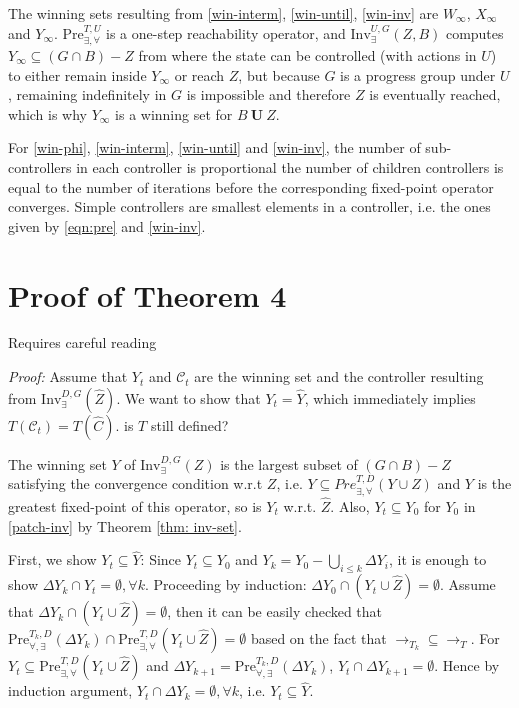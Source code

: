 The winning sets {\color{black} resulting from} \eqref{win-interm}, \eqref{win-until}, \eqref{win-inv} are $ W_{\infty} $, $ X_{\infty} $ and $ Y_{\infty} $. {\color{black} $\text{Pre}_{\exists,\forall}^{T,U}$ is a one-step reachability operator, and $\text{Inv}_{\exists}^{U,G}(Z,B)$ computes $Y_\infty \subseteq (G\cap B) - Z$ from where the state can be controlled (with actions in $U$) to either remain inside $Y_\infty$ or reach $Z$, but because $G$ is a progress group under $U$, remaining indefinitely in $G$ is impossible and therefore $Z$ is
	eventually reached, which is why $Y_\infty$ is a winning set for $B\mathbf{\ U\ }Z$.}
    
    For \eqref{win-phi}, \eqref{win-interm}, \eqref{win-until} and \eqref{win-inv}, the number of sub-controllers in each controller is proportional 
    {\color{purple} the number of children controllers is equal} 
    to the number of iterations before the corresponding fixed-point operator converges. Simple controllers are smallest elements in a controller, i.e. the ones given by \eqref{eqn:pre} and \eqref{win-inv}. 
    
    \section{Proof of Theorem 4}\label{app:pr-31}
    
    {\color{red} Requires careful reading}

\emph{Proof:} Assume that $ Y_t $ and $ \mathcal{C}_t $ are the winning set and the controller resulting from $ \text{Inv}_{\exists}^{D,G} (\widehat{Z}) $. We want to show that $ Y_t=\widehat{Y}$, which immediately implies $ T(\mathcal{C}_t) = T(\widehat{C}) $. {\color{red} is $T$ still defined?}
	
The winning set $ Y $ of $ \text{Inv}_{\exists}^{D,G} (Z) $ is the largest subset of $ (G\cap B) - Z  $ satisfying the convergence condition w.r.t $ Z $, i.e. $ Y \subseteq Pre^{T,D}_{\exists, \forall}(Y\cup Z) $ and $Y$ is the greatest fixed-point of this operator, so is $ Y_t $ w.r.t. $ \widehat{Z} $. Also, $ Y_t \subseteq Y_0 $ for $ Y_0 $ in \eqref{patch-inv} by Theorem \ref{thm: inv-set}. 
	
	First, we show $ Y_t \subseteq \widehat{Y} $: Since $ Y_t\subseteq Y_0 $ and $ Y_k = Y_0 - \bigcup_{i\leq k} \Delta Y_i$, it is enough to show $ \Delta Y_k\cap Y_t = \emptyset,\forall k $. Proceeding by induction: $ \Delta Y_0\cap (Y_t\cup \widehat{Z}) = \emptyset $. Assume that $ \Delta Y_k \cap (Y_t\cup \widehat{Z}) = \emptyset $, then it can be easily checked that $\text{Pre}_{\forall, \exists}^{T_k,D}(\Delta Y_k) \cap  \text{Pre}_{\exists,\forall}^{T,D} (Y_t\cup \widehat{Z}) = \emptyset$ based on the fact that	 $ \rightarrow_{T_k}\subseteq \rightarrow_{T} $. For $ Y_t \subseteq \text{Pre}_{\exists,\forall}^{T,D} (Y_t\cup \widehat{Z}) $ and $ \Delta Y_{k+1} = \text{Pre}_{\forall, \exists}^{T_k,D}(\Delta Y_k) $, $ Y_t\cap \Delta Y_{k+1} = \emptyset $. Hence by induction argument, $ Y_t \cap \Delta Y_k = \emptyset, \forall k $, i.e. $ Y_t\subseteq \widehat{Y} $. 
	
